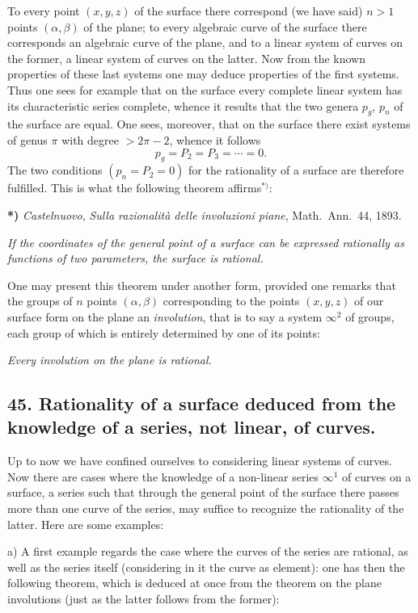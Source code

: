 \documentclass{article}
\begin{document}
To every point $(x, y, z)$ of the surface there correspond (we have said) $n > 1$ points $(\alpha, \beta)$ of the plane; to every algebraic curve of the surface there corresponds an algebraic curve of the plane, and to a linear system of curves on the former, a linear system of curves on the latter. Now from the known properties of these last systems one may deduce properties of the first systems. Thus one sees for example that on the surface every complete linear system has its characteristic series complete, whence it results that the two genera $p_{g}$, $p_{n}$ of the surface are equal. One sees, moreover, that on the surface there exist systems of genus $\pi$ with degree $> 2\pi - 2$, whence it follows
\[ p_{g} = P_{2} = P_{3} = \cdots = 0. \]
The two conditions $(p_{n} = P_{2} = 0)$ for the rationality of a surface are therefore fulfilled. This is what the following theorem affirms${}^{*)}$:

\textbf{*)} \emph{Castelnuovo}, \emph{Sulla razionalità delle involuzioni piane}, Math.\ Ann.\ 44, 1893.


\emph{If the coordinates of the general point of a surface can be expressed rationally as functions of two parameters, the surface is rational.}

One may present this theorem under another form, provided one remarks that the groups of $n$ points $(\alpha, \beta)$ corresponding to the points $(x, y, z)$ of our surface form on the plane an \emph{involution}, that is to say a system $\infty^{2}$ of groups, each group of which is entirely determined by one of its points:

\emph{Every involution on the plane is rational.}

\subsection*{45. Rationality of a surface deduced from the knowledge of a series, not linear, of curves.}

Up to now we have confined ourselves to considering linear systems of curves. Now there are cases where the knowledge of a non-linear series $\infty^{1}$ of curves on a surface, a series such that through the general point of the surface there passes more than one curve of the series, may suffice to recognize the rationality of the latter. Here are some examples:

a) A first example regards the case where the curves of the series are rational, as well as the series itself (considering in it the curve as element): one has then the following theorem, which is deduced at once from the theorem on the plane involutions (just as the latter follows from the former):
\end{document}
